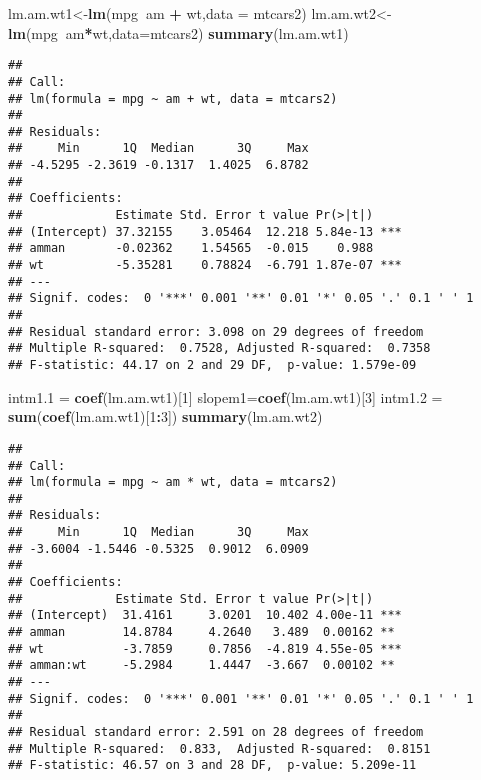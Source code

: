 \documentclass[
]{article}
\newenvironment{Shaded}{\begin{snugshade}}{\end{snugshade}}
\newcommand{\DataTypeTok}[1]{\textcolor[rgb]{0.13,0.29,0.53}{#1}}
\newcommand{\DecValTok}[1]{\textcolor[rgb]{0.00,0.00,0.81}{#1}}
\newcommand{\FloatTok}[1]{\textcolor[rgb]{0.00,0.00,0.81}{#1}}
\newcommand{\KeywordTok}[1]{\textcolor[rgb]{0.13,0.29,0.53}{\textbf{#1}}}
\newcommand{\NormalTok}[1]{#1}
\newcommand{\OperatorTok}[1]{\textcolor[rgb]{0.81,0.36,0.00}{\textbf{#1}}}
\newcommand{\StringTok}[1]{\textcolor[rgb]{0.31,0.60,0.02}{#1}}
\begin{document}
\begin{Shaded}
\begin{Highlighting}[]
\NormalTok{lm.am.wt1<-}\KeywordTok{lm}\NormalTok{(mpg}\OperatorTok{~}\NormalTok{am }\OperatorTok{+}\StringTok{ }\NormalTok{wt,}\DataTypeTok{data =}\NormalTok{ mtcars2)}
\NormalTok{lm.am.wt2<-}\KeywordTok{lm}\NormalTok{(mpg}\OperatorTok{~}\NormalTok{am}\OperatorTok{*}\NormalTok{wt,}\DataTypeTok{data=}\NormalTok{mtcars2)}
\KeywordTok{summary}\NormalTok{(lm.am.wt1)}
\end{Highlighting}
\end{Shaded}

\begin{verbatim}
## 
## Call:
## lm(formula = mpg ~ am + wt, data = mtcars2)
## 
## Residuals:
##     Min      1Q  Median      3Q     Max 
## -4.5295 -2.3619 -0.1317  1.4025  6.8782 
## 
## Coefficients:
##             Estimate Std. Error t value Pr(>|t|)    
## (Intercept) 37.32155    3.05464  12.218 5.84e-13 ***
## amman       -0.02362    1.54565  -0.015    0.988    
## wt          -5.35281    0.78824  -6.791 1.87e-07 ***
## ---
## Signif. codes:  0 '***' 0.001 '**' 0.01 '*' 0.05 '.' 0.1 ' ' 1
## 
## Residual standard error: 3.098 on 29 degrees of freedom
## Multiple R-squared:  0.7528, Adjusted R-squared:  0.7358 
## F-statistic: 44.17 on 2 and 29 DF,  p-value: 1.579e-09
\end{verbatim}

\begin{Shaded}
\begin{Highlighting}[]
\NormalTok{intm1}\FloatTok{.1}\NormalTok{ =}\StringTok{ }\KeywordTok{coef}\NormalTok{(lm.am.wt1)[}\DecValTok{1}\NormalTok{]}
\NormalTok{slopem1=}\KeywordTok{coef}\NormalTok{(lm.am.wt1)[}\DecValTok{3}\NormalTok{]}
\NormalTok{intm1}\FloatTok{.2}\NormalTok{ =}\StringTok{ }\KeywordTok{sum}\NormalTok{(}\KeywordTok{coef}\NormalTok{(lm.am.wt1)[}\DecValTok{1}\OperatorTok{:}\DecValTok{3}\NormalTok{])}
\KeywordTok{summary}\NormalTok{(lm.am.wt2)}
\end{Highlighting}
\end{Shaded}

\begin{verbatim}
## 
## Call:
## lm(formula = mpg ~ am * wt, data = mtcars2)
## 
## Residuals:
##     Min      1Q  Median      3Q     Max 
## -3.6004 -1.5446 -0.5325  0.9012  6.0909 
## 
## Coefficients:
##             Estimate Std. Error t value Pr(>|t|)    
## (Intercept)  31.4161     3.0201  10.402 4.00e-11 ***
## amman        14.8784     4.2640   3.489  0.00162 ** 
## wt           -3.7859     0.7856  -4.819 4.55e-05 ***
## amman:wt     -5.2984     1.4447  -3.667  0.00102 ** 
## ---
## Signif. codes:  0 '***' 0.001 '**' 0.01 '*' 0.05 '.' 0.1 ' ' 1
## 
## Residual standard error: 2.591 on 28 degrees of freedom
## Multiple R-squared:  0.833,  Adjusted R-squared:  0.8151 
## F-statistic: 46.57 on 3 and 28 DF,  p-value: 5.209e-11
\end{verbatim}
\end{document}
